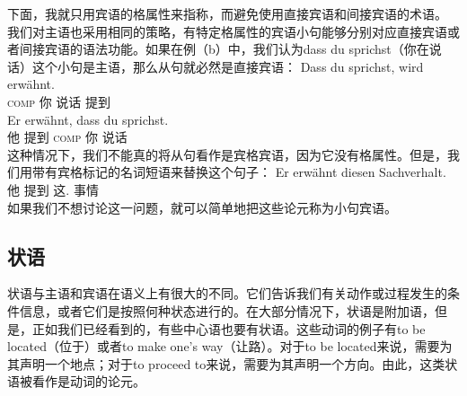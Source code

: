 下面，我就只用宾语的格属性来指称，而避免使用直接宾语和间接宾语的术语。
我们对主语也采用相同的策略，有特定格属性的宾语小句能够分别对应直接宾语或者间接宾语的语法功能。如果在例（b）中，我们认为dass du sprichst（你在说话）这个小句是主语，那么从句就必然是直接宾语：
\eal
\ex\label{Beispiel-dass-du-sprichst} 
\gll Dass du sprichst, wird erwähnt.\\
     \textsc{comp} 你 说话 \passiveprs{} 提到\\
\ex
\gll Er erwähnt, dass du sprichst.\\
	 他 提到 \textsc{comp} 你 说话\\
\zl
这种情况下，我们不能真的将从句看作是宾格宾语，因为它没有格属性。但是，我们用带有宾格标记的名词短语来替换这个句子：
\ea
\gll Er erwähnt diesen Sachverhalt.\\
	 他 提到 这.\acc{} 事情\\
\z
如果我们不想讨论这一问题，就可以简单地把这些论元称为小句宾语。


\subsection{状语}
\label{sec-Adverbiale}
状语与主语和宾语在语义上有很大的不同。它们告诉我们有关动作或过程发生的条件信息，或者它们是按照何种状态进行的。在大部分情况下，状语是附加语，但是，正如我们已经看到的，有些中心语也要有状语。这些动词的例子有to be located（位于）或者to make one's way（让路）。对于to be located来说，需要为其声明一个地点；对于to proceed to来说，需要为其声明一个方向。由此，这类状语被看作是动词的论元。

